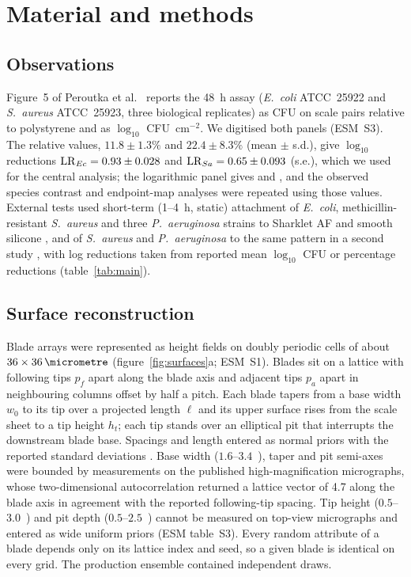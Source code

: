 \documentclass[11pt]{article}
\newcommand{\Ec}{\textit{E.~coli}}
\newcommand{\Sa}{\textit{S.~aureus}}
\newcommand{\Pa}{\textit{P.~aeruginosa}}
\begin{document}
\section{Material and methods}

\subsection{Observations}
Figure~5 of Peroutka et al.\ \cite{Peroutka2026} reports the 48~h assay (\Ec{} ATCC~25922 and \Sa{} ATCC~25923, three biological replicates) as CFU on scale pairs relative to polystyrene and as $\log_{10}$ CFU~cm$^{-2}$. We digitised both panels (ESM~S3). The relative values, $11.8\pm1.3\%$ and $22.4\pm8.3\%$ (mean $\pm$ s.d.), give $\log_{10}$ reductions $\mathrm{LR}_{Ec}=0.93\pm0.028$ and $\mathrm{LR}_{Sa}=0.65\pm0.093$ (s.e.), which we used for the central analysis; the logarithmic panel gives \LRobsBEc{} and \LRobsBSa{}, and the observed species contrast and endpoint-map analyses were repeated using those values. External tests used short-term (1--4~h, static) attachment of \Ec{}, methicillin-resistant \Sa{} and three \Pa{} strains to Sharklet AF and smooth silicone \cite{May2014}, and of \Sa{} and \Pa{} to the same pattern in a second study \cite{Xu2017}, with log reductions taken from reported mean $\log_{10}$ CFU or percentage reductions (table~\ref{tab:main}).

\subsection{Surface reconstruction}
Blade arrays were represented as height fields on doubly periodic cells of about $36\times\SI{36}{\micrometre}$ (figure~\ref{fig:surfaces}a; ESM~S1). Blades sit on a lattice with following tips $p_f$ apart along the blade axis and adjacent tips $p_a$ apart in neighbouring columns offset by half a pitch. Each blade tapers from a base width $w_0$ to its tip over a projected length $\ell$ and its upper surface rises from the scale sheet to a tip height $h_t$; each tip stands over an elliptical pit that interrupts the downstream blade base. Spacings and length entered as normal priors with the reported standard deviations \cite{Peroutka2026}. Base width ($1.6$--$3.4$~\si{\micrometre}), taper and pit semi-axes were bounded by measurements on the published high-magnification micrographs, whose two-dimensional autocorrelation returned a lattice vector of \SI{4.7}{\micrometre} along the blade axis in agreement with the reported following-tip spacing. Tip height ($0.5$--$3.0$~\si{\micrometre}) and pit depth ($0.5$--$2.5$~\si{\micrometre}) cannot be measured on top-view micrographs and entered as wide uniform priors (ESM table~S3). Every random attribute of a blade depends only on its lattice index and seed, so a given blade is identical on every grid. The production ensemble contained \EnsN{} independent draws.
\end{document}

